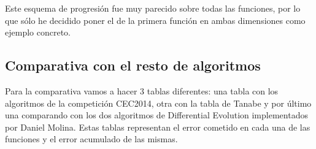 \documentclass[12pt,a4paper]{article}
\begin{document}
	Este esquema de progresión fue muy parecido sobre todas las funciones, por lo que sólo he decidido poner el de la primera función en ambas dimensiones como ejemplo concreto.
	
	\subsection{Comparativa con el resto de algoritmos}
	
	Para la comparativa vamos a hacer 3 tablas diferentes: una tabla con los algoritmos de la competición CEC2014, otra con la tabla de Tanabe y por último una comparando con los dos algoritmos de Differential Evolution implementados por Daniel Molina. Estas tablas representan el error cometido en cada una de las funciones y el error acumulado de las mismas.
	
\end{document}
